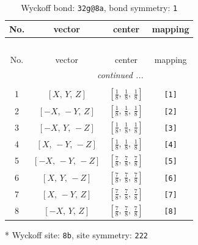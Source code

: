 \documentclass[fleqn,8pt]{jsarticle}
\begin{document}
\renewcommand{\arraystretch}{1.2}
\begin{longtable}{cccc}
\caption{Wyckoff bond: {\tt 32g@8a}, bond symmetry: {\tt 1}}
 \\
 \hline \hline
No. & vector & center & mapping \\ \hline \endfirsthead

\multicolumn{3}{l}{\tablename\ \thetable{}} \\
 \hline \hline
No. & vector & center & mapping \\ \hline \endhead

 \hline \hline
\multicolumn{3}{r}{\footnotesize\it continued ...} \\ \endfoot

 \hline \hline
\multicolumn{3}{r}{} \\ \endlastfoot

1 & $\left[ X,\, Y,\, Z \right]$ & $\left[ \frac{1}{8},\, \frac{1}{8},\, \frac{1}{8} \right]$ & {\tt [1]} \\ \hline
2 & $\left[ - X,\, - Y,\, Z \right]$ & $\left[ \frac{1}{8},\, \frac{1}{8},\, \frac{1}{8} \right]$ & {\tt [2]} \\ \hline
3 & $\left[ - X,\, Y,\, - Z \right]$ & $\left[ \frac{1}{8},\, \frac{1}{8},\, \frac{1}{8} \right]$ & {\tt [3]} \\ \hline
4 & $\left[ X,\, - Y,\, - Z \right]$ & $\left[ \frac{1}{8},\, \frac{1}{8},\, \frac{1}{8} \right]$ & {\tt [4]} \\ \hline
5 & $\left[ - X,\, - Y,\, - Z \right]$ & $\left[ \frac{7}{8},\, \frac{7}{8},\, \frac{7}{8} \right]$ & {\tt [5]} \\ \hline
6 & $\left[ X,\, Y,\, - Z \right]$ & $\left[ \frac{7}{8},\, \frac{7}{8},\, \frac{7}{8} \right]$ & {\tt [6]} \\ \hline
7 & $\left[ X,\, - Y,\, Z \right]$ & $\left[ \frac{7}{8},\, \frac{7}{8},\, \frac{7}{8} \right]$ & {\tt [7]} \\ \hline
8 & $\left[ - X,\, Y,\, Z \right]$ & $\left[ \frac{7}{8},\, \frac{7}{8},\, \frac{7}{8} \right]$ & {\tt [8]} \\
\end{longtable}
* Wyckoff site: {\tt 8b}, site symmetry: {\tt 222}
\renewcommand{\arraystretch}{1.2}
\end{document}
